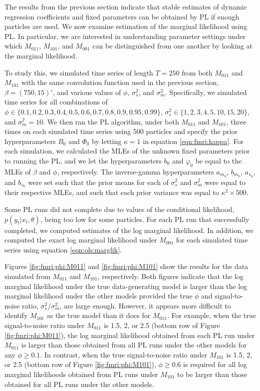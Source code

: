 The results from the previous section indicate that stable estimates of dynamic regression coefficients and fixed parameters can be obtained by PL if enough particles are used. We now examine estimation of the marginal likelihood using PL. In particular, we are interested in understanding parameter settings under which $M_{011}$, $M_{101}$, and $M_{001}$ can be distinguished from one another by looking at the marginal likelihood.

To study this, we simulated time series of length $T = 250$ from both $M_{011}$ and $M_{101}$ with the same convolution function used in the previous section, $\beta = (750,15)'$, and various values of $\phi$, $\sigma^2_s$, and $\sigma^2_m$. Specifically, we simulated time series for all combinations of $\phi \in \{0.1,0.2,0.3,0.4,0.5,0.6,0.7,0.8,0.9,0.95,0.99\}$, $\sigma^2_s \in \{1,2,3,4,5,10,15,20\}$, and $\sigma^2_m = 10$. We then ran the PL algorithm, under both $M_{011}$ and $M_{101}$, three times on each simulated time series using 500 particles and specify the prior hyperparameters $B_0$ and $\Phi_0$ by letting $\kappa = 1$ in equation \eqref{eqn:fmri:kappa}. For each simulation, we calculated the MLEs of the unknown fixed parameters prior to running the PL, and we let the hyperparameters $b_0$ and $\varphi_0$ be equal to the MLEs of $\beta$ and $\phi$, respectively. The inverse-gamma hyperparameters $a_{m_0}$, $b_{m_0}$, $a_{s_0}$, and $b_{s_0}$ were set such that the prior means for each of $\sigma^2_s$ and $\sigma^2_m$ were equal to their respective MLEs, and such that each prior variance was equal to $\kappa^2\times500$.

Some PL runs did not complete due to values of the conditional likelihood, $p(y_t|x_t,\theta)$, being too low for some particles. For each PL run that successfully completed, we computed estimates of the log marginal likelihood. In addition, we computed the exact log marginal likelihood under $M_{001}$ for each simulated time series using equation \eqref{eqn:ols:marglik}.

Figures \ref{fig:fmri:phi:M011} and \ref{fig:fmri:phi:M101} show the results for the data simulated from $M_{011}$ and $M_{101}$, respectively. Both figures indicate that the log marginal likelihood under the true data-generating model is larger than the log marginal likelihood under the other models provided the true $\phi$ and signal-to-noise ratio, $\sigma^2_s/\sigma^2_m$, are large enough. However, it appears more difficult to identify $M_{101}$ as the true model than it does for $M_{011}$. For example, when the true signal-to-noise ratio under $M_{011}$ is 1.5, 2, or 2.5 (bottom row of Figure \ref{fig:fmri:phi:M011}), the log marginal likelihood obtained from each PL run under $M_{011}$ is larger than those obtained from all PL runs under the other models for any $\phi \ge 0.1$. In contrast, when the true signal-to-noise ratio under $M_{101}$ is 1.5, 2, or 2.5 (bottom row of Figure \ref{fig:fmri:phi:M101}), $\phi \ge 0.6$ is required for all log marginal likelihoods obtained from PL runs under $M_{101}$ to be larger than those obtained for all PL runs under the other models.

